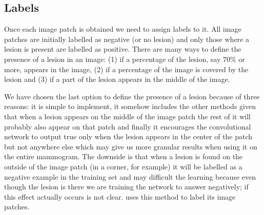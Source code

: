 
\subsection{Labels}
Once each image patch is obtained we need to assign labels to it. All image patches are initially labelled as negative (or no lesion) and only those where a lesion is present are labelled as positive. There are many ways to define the presence of a lesion in an image: (1) if a percentage of the lesion, say 70\% or more, appears in the image, (2) if a percentage of the image is covered by the lesion and (3) if a part of the lesion appears in the middle of the image.

We have chosen the last option to define the presence of a lesion because of three reasons: it is simple to implement, it somehow includes the other methods given that when a lesion appears on the middle of the image patch the rest of it will probably also appear on that patch and finally it encourages the convolutional network to output true only when the lesion appears in the center of the patch but not anywhere else which may give us more granular results when using it on the entire mammogram. The downside is that when a lesion is found on the outside of the image patch (in a corner, for example) it will be labelled as a negative example in the training set and may difficult the learning because even though the lesion is there we are training the network to answer negatively; if this effect actually occurs is not clear. \cite{Ciresan2013} uses this method to label its image patches.

